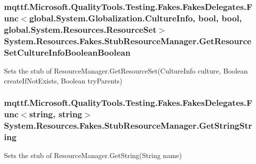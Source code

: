 \hypertarget{class_system_1_1_resources_1_1_fakes_1_1_stub_resource_manager_ae16e8e628ec488541f5b617cf31eb9e7}{
\subsubsection[{Get\-Resource\-Set\-Culture\-Info\-Boolean\-Boolean}]{\setlength{\rightskip}{0pt plus 5cm}mqttf.\-Microsoft.\-Quality\-Tools.\-Testing.\-Fakes.\-Fakes\-Delegates.\-Func$<$global.\-System.\-Globalization.\-Culture\-Info, bool, bool, global.\-System.\-Resources.\-Resource\-Set$>$ System.\-Resources.\-Fakes.\-Stub\-Resource\-Manager.\-Get\-Resource\-Set\-Culture\-Info\-Boolean\-Boolean}}\label{class_system_1_1_resources_1_1_fakes_1_1_stub_resource_manager_ae16e8e628ec488541f5b617cf31eb9e7}


Sets the stub of Resource\-Manager.\-Get\-Resource\-Set(\-Culture\-Info culture, Boolean create\-If\-Not\-Exists, Boolean try\-Parents)

\hypertarget{class_system_1_1_resources_1_1_fakes_1_1_stub_resource_manager_ac26cc5dc427fdab0af5d1d23e2113516}{
\subsubsection[{Get\-String\-String}]{\setlength{\rightskip}{0pt plus 5cm}mqttf.\-Microsoft.\-Quality\-Tools.\-Testing.\-Fakes.\-Fakes\-Delegates.\-Func$<$string, string$>$ System.\-Resources.\-Fakes.\-Stub\-Resource\-Manager.\-Get\-String\-String}}\label{class_system_1_1_resources_1_1_fakes_1_1_stub_resource_manager_ac26cc5dc427fdab0af5d1d23e2113516}


Sets the stub of Resource\-Manager.\-Get\-String(\-String name)


